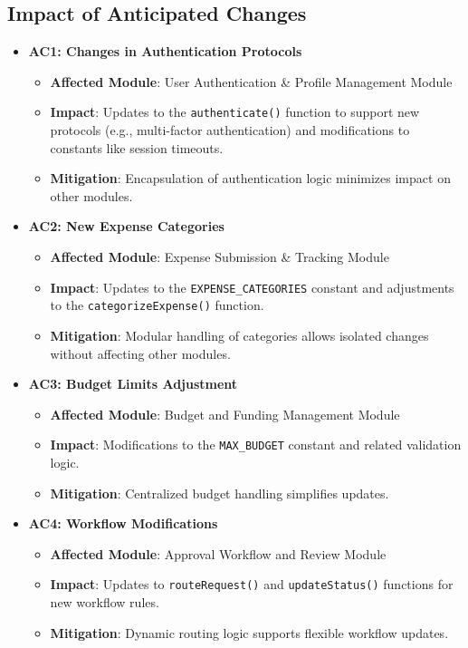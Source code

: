 \documentclass[12pt, titlepage]{article}
\begin{document}
\subsection{Impact of Anticipated Changes}

\begin{itemize}
    \item \textbf{AC1: Changes in Authentication Protocols}
    \begin{itemize}
        \item \textbf{Affected Module}: User Authentication \& Profile Management Module
        \item \textbf{Impact}: Updates to the \texttt{authenticate()} function to support new protocols (e.g., multi-factor authentication) and modifications to constants like session timeouts.
        \item \textbf{Mitigation}: Encapsulation of authentication logic minimizes impact on other modules.
    \end{itemize}
    
    \item \textbf{AC2: New Expense Categories}
    \begin{itemize}
        \item \textbf{Affected Module}: Expense Submission \& Tracking Module
        \item \textbf{Impact}: Updates to the \texttt{EXPENSE\_CATEGORIES} constant and adjustments to the \texttt{categorizeExpense()} function.
        \item \textbf{Mitigation}: Modular handling of categories allows isolated changes without affecting other modules.
    \end{itemize}
    
    \item \textbf{AC3: Budget Limits Adjustment}
    \begin{itemize}
        \item \textbf{Affected Module}: Budget and Funding Management Module
        \item \textbf{Impact}: Modifications to the \texttt{MAX\_BUDGET} constant and related validation logic.
        \item \textbf{Mitigation}: Centralized budget handling simplifies updates.
    \end{itemize}
    
    \item \textbf{AC4: Workflow Modifications}
    \begin{itemize}
        \item \textbf{Affected Module}: Approval Workflow and Review Module
        \item \textbf{Impact}: Updates to \texttt{routeRequest()} and \texttt{updateStatus()} functions for new workflow rules.
        \item \textbf{Mitigation}: Dynamic routing logic supports flexible workflow updates.
    \end{itemize}
    

\end{itemize}
\end{document}
